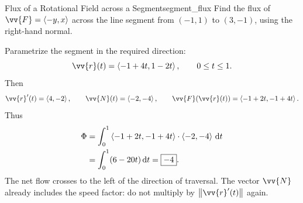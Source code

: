 \newpage
\begin{problem}{Flux of a Rotational Field across a Segment}{segment_flux}
Find the flux of $\vv{F} = \ang{-y,x}$ across the line segment from $(-1,1)$ to $(3,-1)$, using the right-hand normal.
\end{problem}
\begin{sol}
Parametrize the segment in the required direction:
\[
    \vv{r}(t) = \ang{-1 + 4t,1 - 2t},\qquad 0 \le t \le 1.
\]
Then
\[
    \vv{r}'(t) = \ang{4,-2},\qquad
    \vv{N}(t) = \ang{-2,-4},\qquad
    \vv{F}(\vv{r}(t)) = \ang{-1 + 2t,-1 + 4t}.
\]
Thus
\begin{align*}
    \Phi &= \int_0^1\left\langle -1 + 2t,-1 + 4t \right\rangle\cdot\left\langle -2,-4 \right\rangle\,\mathrm{d}t\\
    &= \int_0^1(6 - 20t)\,\mathrm{d}t
    = \boxed{-4}.
\end{align*}
The net flow crosses to the left of the direction of traversal. The vector $\vv{N}$ already includes the speed factor: do not multiply by $\norm{\vv{r}'(t)}$ again.
\end{sol}
\begin{center}
\end{center}

